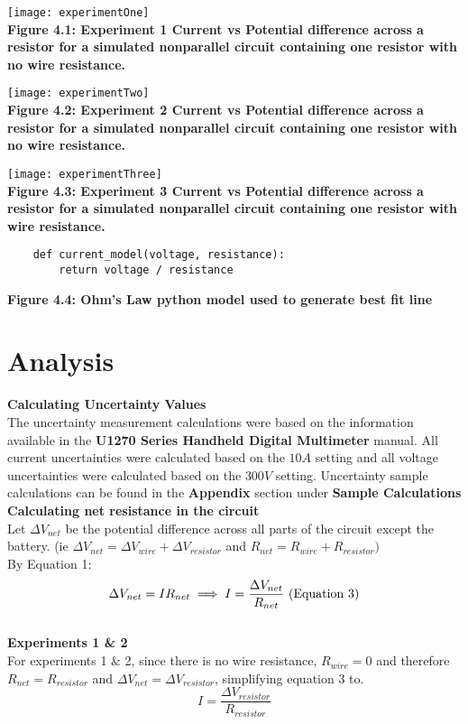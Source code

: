 \documentclass[
	letterpaper, %
	12pt, %
]{CSUniSchoolLabReport}
\begin{document}
\begin{center}
    \texttt{[image: experimentOne]}\\
    \textbf{Figure 4.1: Experiment 1 Current vs Potential difference across a resistor for a simulated nonparallel circuit containing one resistor with no wire resistance.}
\end{center}
\begin{center}
    \texttt{[image: experimentTwo]}\\
    \textbf{Figure 4.2: Experiment 2 Current vs Potential difference across a resistor for a simulated nonparallel circuit containing one resistor with no wire resistance.}
\end{center}
\begin{center}
    \texttt{[image: experimentThree]}\\
	\textbf{Figure 4.3: Experiment 3 Current vs Potential difference across a resistor for a simulated nonparallel circuit containing one resistor with wire resistance.}
\end{center}
\begin{verbatim}
    def current_model(voltage, resistance):
        return voltage / resistance
\end{verbatim}
\begin{center}
    \textbf{Figure 4.4: Ohm's Law python model used to generate best fit line}
\end{center}
\newpage
\section{Analysis}
{\large\textbf{Calculating Uncertainty Values}}\\
The uncertainty measurement calculations were based on the information available in the \textbf{U1270 Series Handheld Digital Multimeter} manual. All current uncertainties were calculated based on the $10A$ setting and all voltage uncertainties were calculated based on the $300V$ setting. Uncertainty sample calculations can be found in the \textbf{Appendix} section under \textbf{Sample Calculations} \\

{\large\textbf{Calculating net resistance in the circuit}}\\

Let $\Delta V_{net}$ be the potential difference across all parts of the circuit except the battery. (ie $\Delta V_{net} = \Delta V_{wire} + \Delta V_{resistor}$ and $R_{net} = R_{wire}+ R_{resistor})$\\
By Equation 1:
$$ \Delta V_{net}= IR_{net} \implies I = \frac{\Delta V_{net}}{R_{net}}\  ({\rm Equation\  3})$$\\
\textbf{Experiments 1 \& 2}\\
For experiments 1 \& 2, since there is no wire resistance, $R_{wire} = 0$ and therefore $R_{net} =R_{resistor}$ and $\Delta V_{net} = \Delta V_{resistor}$, simplifying equation 3 to.\\
$$I = \frac{\Delta V_{resistor}}{R_{resistor}}$$\\
\end{document}
